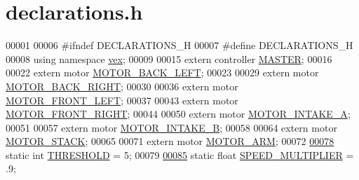 \hypertarget{declarations_8h_source}{}\section{declarations.\+h}
\label{declarations_8h_source}

\begin{DoxyCode}
00001 
00006 \textcolor{preprocessor}{#ifndef DECLARATIONS\_H}
00007 \textcolor{preprocessor}{#define DECLARATIONS\_H}
00008 \textcolor{keyword}{using namespace }\mbox{\hyperlink{namespacevex}{vex}};
00009 
00015 \textcolor{keyword}{extern} controller \mbox{\hyperlink{declarations_8h_ab04f8ff803f7f02c23e713402e13bf32_ab04f8ff803f7f02c23e713402e13bf32}{MASTER}};
00016 
00022 \textcolor{keyword}{extern} motor \mbox{\hyperlink{declarations_8h_ab24214b642128d0f3cb67e9b12e7d4fb_ab24214b642128d0f3cb67e9b12e7d4fb}{MOTOR\_BACK\_LEFT}};
00023 
00029 \textcolor{keyword}{extern} motor \mbox{\hyperlink{declarations_8h_adece81dedf91c2893ba42dc05135a575_adece81dedf91c2893ba42dc05135a575}{MOTOR\_BACK\_RIGHT}};
00030 
00036 \textcolor{keyword}{extern}  motor \mbox{\hyperlink{declarations_8h_a8c6f6315caf1d81bf4d4d113d0f7bffc_a8c6f6315caf1d81bf4d4d113d0f7bffc}{MOTOR\_FRONT\_LEFT}};
00037 
00043 \textcolor{keyword}{extern} motor \mbox{\hyperlink{declarations_8h_ad6a9ea3d338421c5d709c32ae1aa42d8_ad6a9ea3d338421c5d709c32ae1aa42d8}{MOTOR\_FRONT\_RIGHT}};
00044 
00050 \textcolor{keyword}{extern} motor \mbox{\hyperlink{declarations_8h_a34de211d15bfb3c0ac450597fd96b4fc_a34de211d15bfb3c0ac450597fd96b4fc}{MOTOR\_INTAKE\_A}};
00051 
00057 \textcolor{keyword}{extern} motor \mbox{\hyperlink{declarations_8h_a5ae79e7ed71b0b94b3983c22c60c2eaa_a5ae79e7ed71b0b94b3983c22c60c2eaa}{MOTOR\_INTAKE\_B}};
00058 
00064 \textcolor{keyword}{extern} motor \mbox{\hyperlink{declarations_8h_a212c888d64ffcd7e7b44a548fa0408a9_a212c888d64ffcd7e7b44a548fa0408a9}{MOTOR\_STACK}};
00065 
00071 \textcolor{keyword}{extern} motor \mbox{\hyperlink{declarations_8h_a9a834f9a2c804ef0d65ed2f68c10a61a_a9a834f9a2c804ef0d65ed2f68c10a61a}{MOTOR\_ARM}};
00072 
\mbox{\hyperlink{declarations_8h_adceb947873623dd2a87f7f69e81fbd38_adceb947873623dd2a87f7f69e81fbd38}{00078}} \textcolor{keyword}{static} \textcolor{keywordtype}{int} \mbox{\hyperlink{declarations_8h_adceb947873623dd2a87f7f69e81fbd38_adceb947873623dd2a87f7f69e81fbd38}{THRESHOLD}} = 5;
00079 
\mbox{\hyperlink{declarations_8h_afb49f22bdd1e93218d02bb25e513e8a0_afb49f22bdd1e93218d02bb25e513e8a0}{00085}} \textcolor{keyword}{static} \textcolor{keywordtype}{float} \mbox{\hyperlink{declarations_8h_afb49f22bdd1e93218d02bb25e513e8a0_afb49f22bdd1e93218d02bb25e513e8a0}{SPEED\_MULTIPLIER}} = .9;

\end{DoxyCode}
